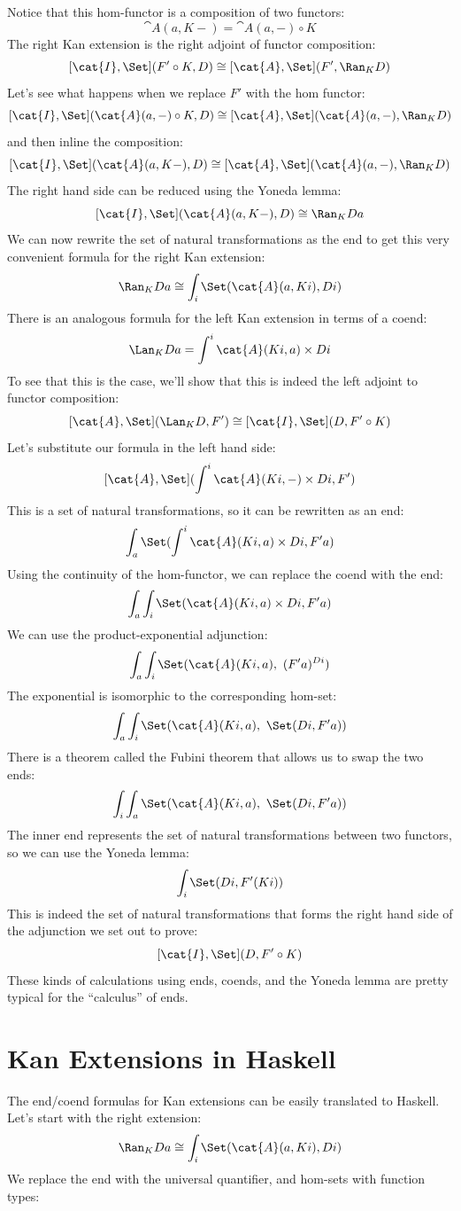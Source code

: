 \noindent
Notice that this hom-functor is a composition of two functors:
\[\cat{A}(a, K -) = \cat{A}(a, -) \circ K\]
The right Kan extension is the right adjoint of functor composition:
\[[\cat{I}, \Set](F' \circ K, D) \cong [\cat{A}, \Set](F', \Ran_{K}D)\]
Let's see what happens when we replace $F'$ with the hom
functor:
\[[\cat{I}, \Set](\cat{A}(a, -) \circ K, D) \cong [\cat{A}, \Set](\cat{A}(a, -), \Ran_{K}D)\]
and then inline the composition:
\[[\cat{I}, \Set](\cat{A}(a, K -), D) \cong [\cat{A}, \Set](\cat{A}(a, -), \Ran_{K}D)\]
The right hand side can be reduced using the Yoneda lemma:
\[[\cat{I}, \Set](\cat{A}(a, K -), D) \cong \Ran_{K}D a\]
We can now rewrite the set of natural transformations as the end to get
this very convenient formula for the right Kan extension:
\[\Ran_{K}D a \cong \int_i \Set(\cat{A}(a, K i), D i)\]
There is an analogous formula for the left Kan extension in terms of a
coend:
\[\Lan_{K}D a = \int^i \cat{A}(K i, a)\times{}D i\]
To see that this is the case, we'll show that this is indeed the left
adjoint to functor composition:
\[[\cat{A}, \Set](\Lan_{K}D, F') \cong [\cat{I}, \Set](D, F' \circ K)\]
Let's substitute our formula in the left hand side:
\[[\cat{A}, \Set](\int^i \cat{A}(K i, -)\times{}D i, F')\]
This is a set of natural transformations, so it can be rewritten as an
end:
\[\int_a \Set(\int^i \cat{A}(K i, a)\times{}D i, F' a)\]
Using the continuity of the hom-functor, we can replace the coend with
the end:
\[\int_a \int_i \Set(\cat{A}(K i, a)\times{}D i, F' a)\]
We can use the product-exponential adjunction:
\[\int_a \int_i \Set(\cat{A}(K i, a),\ (F' a)^{D i})\]
The exponential is isomorphic to the corresponding hom-set:
\[\int_a \int_i \Set(\cat{A}(K i, a),\ \Set(D i, F' a))\]
There is a theorem called the Fubini theorem that allows us to swap the
two ends:
\[\int_i \int_a \Set(\cat{A}(K i, a),\ \Set(D i, F' a))\]
The inner end represents the set of natural transformations between two
functors, so we can use the Yoneda lemma:
\[\int_i \Set(D i, F' (K i))\]
This is indeed the set of natural transformations that forms the right
hand side of the adjunction we set out to prove:
\[[\cat{I}, \Set](D, F' \circ K)\]
These kinds of calculations using ends, coends, and the Yoneda lemma are
pretty typical for the ``calculus'' of ends.

\section{Kan Extensions in Haskell}

The end/coend formulas for Kan extensions can be easily translated to
Haskell. Let's start with the right extension:
\[\Ran_{K}D a \cong \int_i \Set(\cat{A}(a, K i), D i)\]
We replace the end with the universal quantifier, and hom-sets with
function types:

